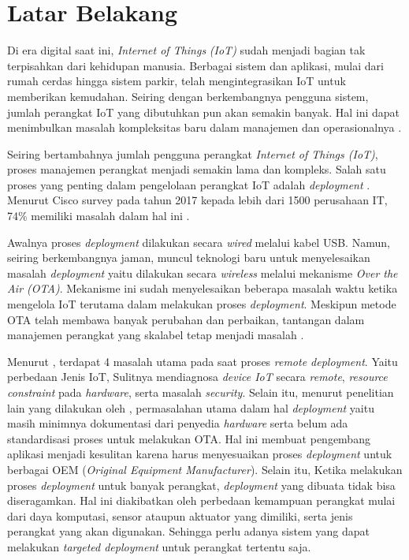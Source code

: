 \section{Latar Belakang}
\label{sec:latar-belakang}

Di era digital saat ini, \textit{Internet of Things} \textit{(IoT)} sudah menjadi bagian tak terpisahkan dari kehidupan manusia. Berbagai sistem dan aplikasi, mulai dari rumah cerdas hingga sistem parkir, telah mengintegrasikan IoT untuk memberikan kemudahan. Seiring dengan berkembangnya pengguna sistem, jumlah perangkat IoT yang dibutuhkan pun akan semakin banyak. Hal ini dapat menimbulkan masalah kompleksitas baru dalam manajemen dan operasionalnya \parencite{IOTSmartCity}.

Seiring bertambahnya jumlah pengguna perangkat \textit{Internet of Things (IoT)}, proses manajemen perangkat menjadi semakin lama dan kompleks. Salah satu proses yang penting dalam pengelolaan perangkat IoT adalah \textit{deployment} \parencite{OTAKeyPrinciples}. Menurut Cisco survey pada tahun 2017 kepada lebih dari 1500 perusahaan IT, 74\% memiliki masalah dalam hal ini \parencite{RemoteDeployment}.

Awalnya proses \textit{deployment} dilakukan secara \textit{wired} melalui kabel USB. Namun, seiring berkembangnya jaman, muncul teknologi baru untuk menyelesaikan masalah \textit{deployment} yaitu dilakukan secara \textit{wireless} melalui mekanisme \textit{Over the Air (OTA)}. Mekanisme ini sudah menyelesaikan beberapa masalah waktu ketika mengelola IoT terutama dalam melakukan proses \textit{deployment}. Meskipun metode OTA telah membawa banyak perubahan dan perbaikan, tantangan dalam manajemen perangkat yang skalabel tetap menjadi masalah \parencite{ElJaouhari2022}.

Menurut \parencite{RemoteDeployment}, terdapat 4 masalah utama pada saat proses \textit{remote deployment}. Yaitu perbedaan Jenis IoT, Sulitnya mendiagnosa \textit{device IoT} secara \textit{remote}, \textit{resource constraint} pada \textit{hardware}, serta masalah \textit{security}. Selain itu, menurut penelitian lain yang dilakukan oleh \parencite{studyovertheair1}, permasalahan utama dalam hal \textit{deployment} yaitu masih minimnya dokumentasi dari penyedia \textit{hardware} serta belum ada standardisasi proses untuk melakukan OTA. Hal ini membuat pengembang aplikasi menjadi kesulitan karena harus menyesuaikan proses \textit{deployment} untuk berbagai OEM (\textit{Original Equipment Manufacturer}). Selain itu, Ketika melakukan proses \textit{deployment} untuk banyak perangkat, \textit{deployment} yang dibuata tidak bisa diseragamkan. Hal ini diakibatkan oleh perbedaan kemampuan perangkat mulai dari daya komputasi, sensor ataupun aktuator yang dimiliki, serta jenis perangkat yang akan digunakan. Sehingga perlu adanya sistem yang dapat melakukan \textit{targeted deployment} untuk perangkat tertentu saja.


